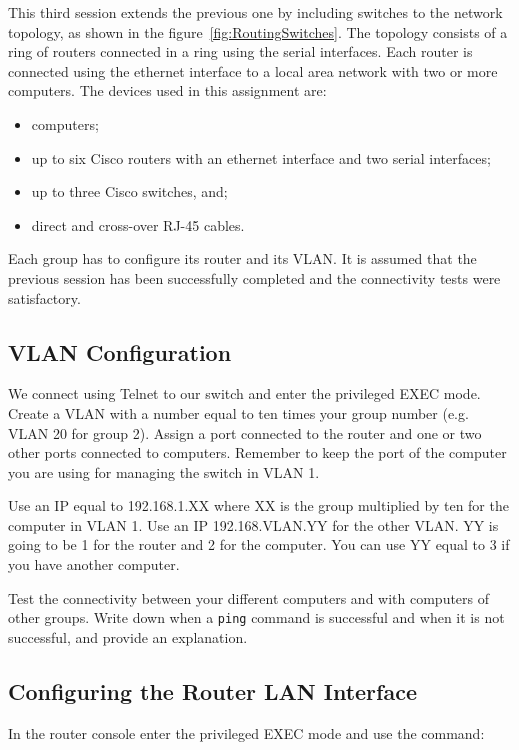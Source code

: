 This third session extends the previous one by including switches to the network topology, as shown in the figure~\ref{fig:RoutingSwitches}. The topology consists of a ring of routers connected in a ring using the serial interfaces. Each router is connected using the ethernet interface to a local area network with two or more computers. The devices used in this assignment are:

\begin{itemize}
\item computers;
\item up to six Cisco routers with an ethernet interface and two serial interfaces;
\item up to three Cisco switches, and;
\item direct and cross-over RJ-45 cables.
\end{itemize}

Each group has to configure its router and its VLAN. It is assumed that the previous session has been successfully completed and the connectivity tests were satisfactory.

\subsection{VLAN Configuration}

We connect using Telnet to our switch and enter the privileged EXEC mode. Create a VLAN with a number equal to ten times your group number (e.g. VLAN 20 for group 2). Assign a port connected to the router and one or two other ports connected to computers. Remember to keep the port of the computer you are using for managing the switch in VLAN 1.

Use an IP equal to 192.168.1.XX where XX is the group multiplied by ten for the computer in VLAN 1. Use an IP 192.168.VLAN.YY for the other VLAN. YY is going to be 1 for the router and 2 for the computer. You can use YY equal to 3 if you have another computer.

Test the connectivity between your different computers and with computers of other groups. Write down when a \texttt{\color{blue}ping} command is successful and when it is not successful, and provide an explanation.

\subsection{Configuring the Router LAN Interface}

In the router console enter the privileged EXEC mode and use the command:

